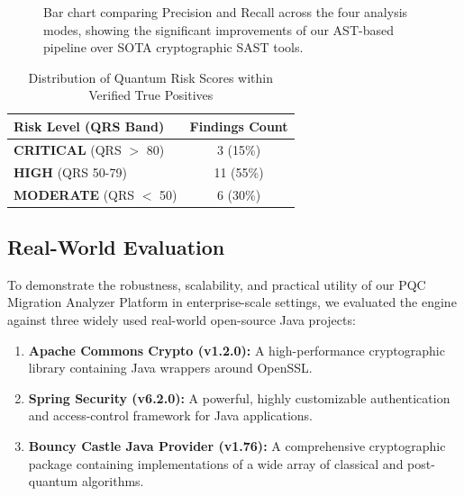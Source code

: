 \documentclass[conference]{IEEEtran}
\begin{document}
\begin{figure}[h]
\centering
{}
\caption{Bar chart comparing Precision and Recall across the four analysis modes, showing the significant improvements of our AST-based pipeline over SOTA cryptographic SAST tools.}
\label{fig:chart}
\end{figure}

\begin{table}[h]
\caption{Distribution of Quantum Risk Scores within Verified True Positives}
\begin{center}
\renewcommand{\arraystretch}{1.3}
\begin{tabular}{|l|c|}
\hline
\textbf{Risk Level (QRS Band)} & \textbf{Findings Count} \\
\hline
\hline
\textbf{CRITICAL} (QRS $>$ 80) & 3 (15\%) \\
\hline
\textbf{HIGH} (QRS 50-79) & 11 (55\%) \\
\hline
\textbf{MODERATE} (QRS $<$ 50) & 6 (30\%) \\
\hline
\end{tabular}
\label{tab:qrs_distribution}
\end{center}
\end{table}

\subsection{Real-World Evaluation}
To demonstrate the robustness, scalability, and practical utility of our PQC Migration Analyzer Platform in enterprise-scale settings, we evaluated the engine against three widely used real-world open-source Java projects:
\begin{enumerate}
    \item \textbf{Apache Commons Crypto (v1.2.0):} A high-performance cryptographic library containing Java wrappers around OpenSSL.
    \item \textbf{Spring Security (v6.2.0):} A powerful, highly customizable authentication and access-control framework for Java applications.
    \item \textbf{Bouncy Castle Java Provider (v1.76):} A comprehensive cryptographic package containing implementations of a wide array of classical and post-quantum algorithms.
\end{enumerate}
\end{document}
